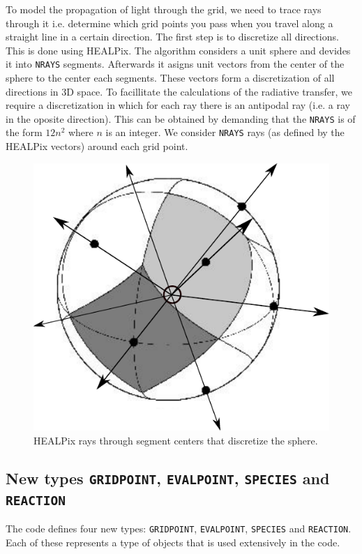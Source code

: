 \documentclass[]{article}
\begin{document}
To model the propagation of light through the grid, we need to trace rays through it i.e. determine which grid points you pass when you travel along a straight line in a certain direction. The first step is to discretize all directions. This is done using HEALPix. The algorithm considers a unit sphere and devides it into \texttt{NRAYS} segments. Afterwards it asigns unit vectors from the center of the sphere to the center each segments. These vectors form a discretization of all directions in 3D space. To facillitate the calculations of the radiative transfer, we require a discretization in which for each ray there is an antipodal ray (i.e. a ray in the oposite direction). This can be obtained by demanding that the \texttt{NRAYS} is of the form $12n^{2}$ where $n$ is an integer. We consider \texttt{NRAYS} rays (as defined by the HEALPix vectors) around each grid point.

\begin{figure}[H]
	\centering
	\includegraphics[scale=.7]{Images/healpixrays.pdf}
	\caption{HEALPix rays through segment centers that discretize the sphere.}
	\label{grid}
\end{figure}

\subsection{New types \texttt{GRIDPOINT}, \texttt{EVALPOINT}, \texttt{SPECIES} and \texttt{REACTION} }
The code defines four new types: \texttt{GRIDPOINT}, \texttt{EVALPOINT}, \texttt{SPECIES} and \texttt{REACTION}. Each of these represents a type of objects that is used extensively in the code.
\end{document}
